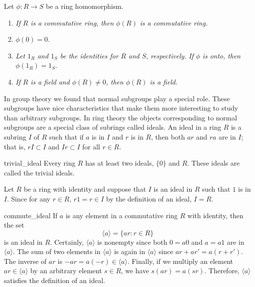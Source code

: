  
\begin{proposition}
Let $\phi : R \rightarrow S$ be a ring homomorphism.
\begin{enumerate}
 
\rm \item \it
If $R$ is a commutative ring, then $\phi(R)$ is a
commutative ring. 
 
\rm \item \it
$\phi( 0 ) = 0$. 
 
\rm \item \it
Let $1_R$ and $1_S$ be the identities for $R$ and $S$, respectively.
If $\phi$ is onto, then $\phi(1_R) = 1_S$.  
 
\rm \item \it
If $R$ is a field and $\phi(R) \neq 0$, then $\phi(R)$ is a field.
 
\end{enumerate}
\end{proposition}
 
 
In group theory we found that normal subgroups play a special role.
These subgroups have nice characteristics that make them more
interesting to study than arbitrary subgroups.  In ring theory the
objects corresponding to normal subgroups are a special class of
subrings called ideals. An {\bfi ideal\/}
in a ring $R$ is a subring $I$ of $R$ such that if $a$ is in $I$ and
$r$ is in $R$, then both $ar$ and $ra$ are in $I$; that is, $rI
\subset I$ and $Ir \subset I$ for all $r \in R$.  
 
 
\begin{example}{trivial_ideal}
Every ring $R$ has at least two ideals, $\{ 0 \}$ and $R$.  These
ideals are called the {\bfi trivial ideals}. 
\end{example}
 
 

 
Let $R$ be a ring with identity and suppose that $I$ is an ideal in
$R$ such that $1$ is in $I$. Since for any $r \in R$, $r1 = r \in 
I$ by the definition of an ideal, $I = R$.
 
 
\begin{example}{commute_ideal}
If $a$ is any element in a commutative ring $R$ with identity, then
the set   
\[
\langle a \rangle = \{ ar : r \in R \}
\]
is an ideal in $R$. Certainly, $\langle a \rangle$ is nonempty since both
$0 = a0$ and $a = a1$ are in $\langle a \rangle$. The
sum of two elements in $\langle a \rangle$ is again in $\langle a
\rangle$ since $ar + ar' =  a(r + r')$. The inverse of $ar$ is $-ar =
a (-r) \in \langle a \rangle$.  Finally, if we multiply an element $ar
\in \langle a \rangle$ by an arbitrary element $s \in R$, we have
$s(ar) = a(sr)$.  Therefore, $\langle a \rangle$ satisfies the
definition of an ideal. 
\end{example}
 
